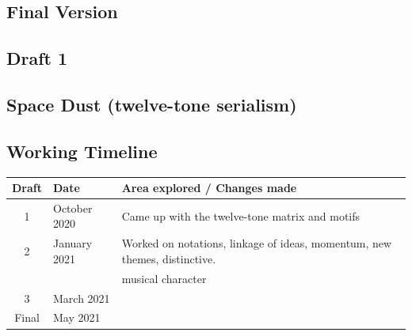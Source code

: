 \documentclass{article}
\newcommand\emptypage{
    \null
    \thispagestyle{empty}
    \newpage
    }
\begin{document}
\newpage
\begin{center}
\vspace*{\fill}
\LARGE
\subsection{Final Version}
\vspace*{\fill}
%
\end{center}

\newpage
\begin{center}
\vspace*{\fill}
\LARGE
\subsection{Draft 1}
\vspace*{\fill}
%
\end{center}
\newpage
\emptypage
\emptypage
\emptypage
\emptypage
\emptypage
\emptypage
\emptypage
\emptypage
\emptypage
\emptypage
\emptypage
\emptypage

\begin{center}
\vspace*{\fill}
\LARGE
    \section{Space Dust (twelve-tone serialism)}
\vspace*{\fill}
%
\end{center}

\newpage

\subsection{Working Timeline}
\begin{center}
	\def\arraystretch{1.5}
\begin{tabular}{|c|l|l|}
	\hline
	Draft&Date&Area explored / Changes made\\
	\hline
	1&October 2020&
    Came up with the twelve-tone matrix and motifs\\
	\hline
	2&January 2021&
    Worked on notations, linkage of ideas, momentum, new themes, distinctive.\\
    &&musical character\\
	\hline
	3&March 2021&\\
	\hline
	Final&May 2021&\\
	\hline
\end{tabular}
\end{center}
\end{document}
